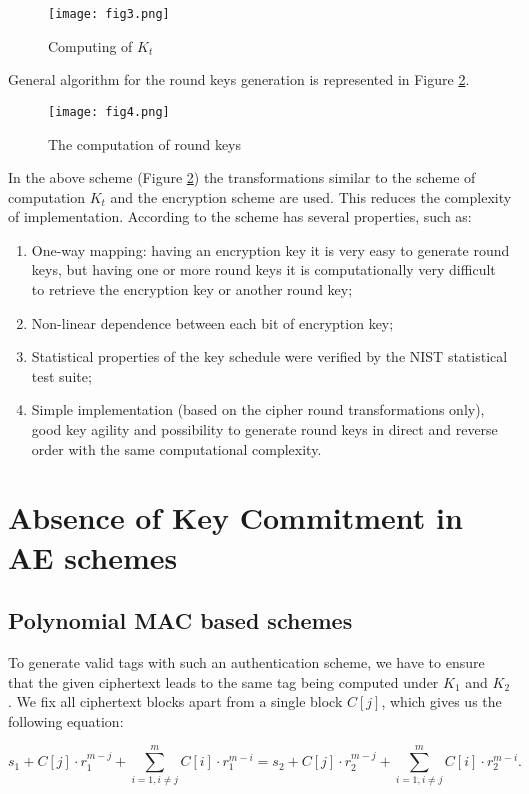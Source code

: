 \documentclass[a4paper,12pt]{spieman} %
\begin{document}
\begin{figure}[H]
    \centering
    \texttt{[image: fig3.png]}
    \caption{Computing of $K_t$}
    \label{5}
\end{figure}

General algorithm for the round keys generation is represented in Figure \ref{6}.

\begin{figure}[H]
    \centering
    \texttt{[image: fig4.png]}
    \caption{The computation of round keys}
    \label{6}
\end{figure}

In the above scheme (Figure \ref{6}) the transformations similar to the scheme of computation $K_t$ and the encryption scheme are used. This reduces the complexity of implementation. According to the scheme has several properties, such as:

\begin{enumerate}
    \item One-way mapping: having an encryption key it is very easy to generate round keys, but having one or more round keys it is computationally very difficult to retrieve the encryption key or another round key;
    \item Non-linear dependence between each bit of encryption key;
    \item Statistical properties of the key schedule were verified by the NIST statistical test suite;
    \item Simple implementation (based on the cipher round transformations only), good key agility and possibility to generate round keys in direct and reverse order with the same computational complexity.
\end{enumerate}

\section{Absence of Key Commitment in AE schemes}
\subsection{Polynomial MAC based schemes}

To generate valid tags with such an authentication scheme, we have to ensure that the given ciphertext leads to the same tag being computed under $K_1$ and $K_2$. We fix all ciphertext blocks apart from a single block $C[j]$, which gives us the following equation:

\begin{equation} \label{7}
s_1+C[j]\cdot r^{m-j}_1+\sum_{i=1,i\neq j}^mC[i]\cdot r^{m-i}_1=s_2+C[j]\cdot r^{m-j}_2+\sum_{i=1,i\neq j}^mC[i]\cdot r^{m-i}_2.
\end{equation}
\end{document}
